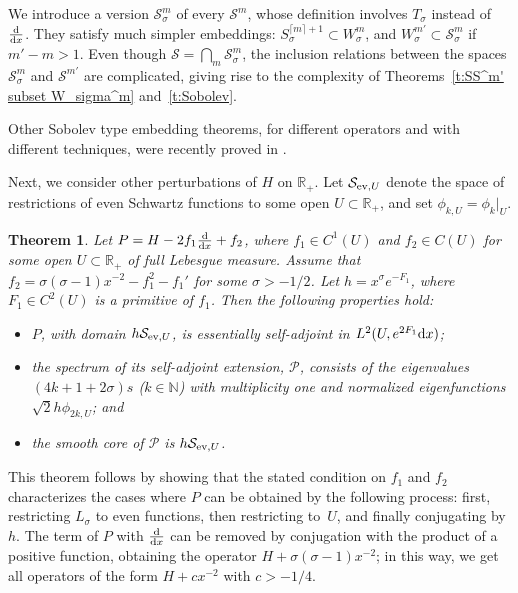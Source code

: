\documentclass[pdftex]{sigma}
\newtheorem{Theorem}{Theorem}[section]
\newcommand{\R}{\mathbb{R}}
\newcommand{\N}{\mathbb{N}}
\newcommand{\PP}{\mathcal{P}}
\renewcommand{\SS}{\mathcal{S}}
\begin{document}
We introduce a version $\SS_\sigma^m$ of every $\SS^m$, whose def\/inition involves $T_\sigma$ instead of $\frac{{\rm d}}{{\rm d}x}$. They satisfy much simpler embeddings: $S_\sigma^{\lceil m\rceil+1}\subset W_\sigma^m$, and $W_\sigma^{m'}\subset\SS_\sigma^m$ if $m'-m>1$. Even though $\SS=\bigcap_m\SS_\sigma^m$, the inclusion relations between the spaces $\SS_\sigma^m$ and $\SS^{m'}$ are complicated, giving rise to the complexity of Theorems~\ref{t:SS^m' subset W_sigma^m} and~\ref{t:Sobolev}.

Other Sobolev type embedding theorems, for dif\/ferent operators and with dif\/ferent techniques, were recently proved in \cite{Watanabe1997,Watanabe2002,Watanabe2004}.

Next, we consider other perturbations of $H$ on $\R_+$. Let $\SS_{\text{\rm ev},U}$ denote the space of restrictions of even Schwartz functions to some open $U\subset\R_+$, and set $\phi_{k,U}=\phi_k|_U$.

\begin{Theorem}\label{t:P}
  Let $P=H-2f_1 \frac{{\rm d}}{{\rm d}x}+f_2$, where $f_1\in C^1(U)$ and $f_2\in C(U)$ for some open $U\subset\R_+$ of full Lebesgue measure. Assume that $f_2=\sigma(\sigma-1)x^{-2}-f_1^2-f_1'$ for some $\sigma>-1/2$. Let $h=x^\sigma e^{-F_1}$, where $F_1\in C^2(U)$ is a primitive of $f_1$. Then the following properties hold:
    \begin{itemize}\itemsep=0pt

      \item[$(i)$] $P$, with domain $h \SS_{\text{\rm ev},U}$, is essentially self-adjoint in $L^2(U,e^{2F_1}{\rm d}x)$;

      \item[$(ii)$] the spectrum of its self-adjoint extension, $\PP$, consists of the eigenvalues $(4k+1+2\sigma)s$ {\rm(}$k\in\N${\rm)} with multiplicity one and normalized eigenfunctions $\sqrt{2} h\phi_{2k,U}$; and

       \item[$(iii)$] the smooth core of $\PP$ is $h\SS_{\text{\rm ev},U}$.

    \end{itemize}
\end{Theorem}

This theorem follows by showing that the stated condition on $f_1$ and $f_2$ characterizes the cases where $P$ can be obtained by the following process: f\/irst, restricting $L_\sigma$ to even functions, then restricting to~$U$, and f\/inally conjugating by $h$. The term of $P$ with $\frac{{\rm d}}{{\rm d}x}$ can be removed by conjugation with the product of a positive function, obtaining the operator $H+\sigma(\sigma-1)x^{-2}$; in this way, we get all operators of the form $H+cx^{-2}$ with $c>-1/4$.
\end{document}
